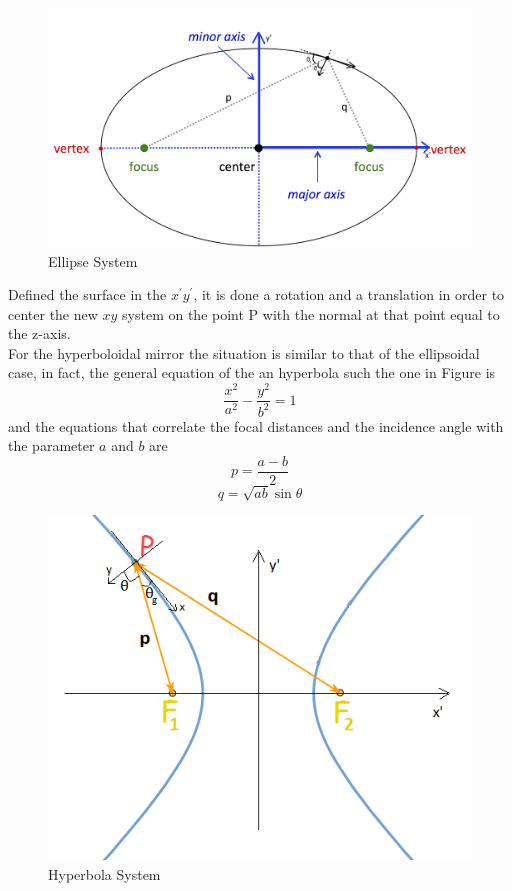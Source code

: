 %
\begin{figure}[H]
%
\centering
%
\includegraphics[width=.8\textwidth]{Immagini/Chapter3/EllipseSystem3}
%
\caption{Ellipse System}
%
\label{fig: ellipse}
%
\end{figure}
%
Defined the surface in the $x^{'}y^{'} $, it is done a rotation and a translation in order to center the new $xy $ system on the point P with the normal at that point equal to the z-axis.
\\
For the hyperboloidal mirror the situation is similar to that of the ellipsoidal case, in fact, the general equation of the an hyperbola such the one in Figure is 
%
\begin{equation}
\frac{x^2}{a^2} - \frac{y^2}{b^2} = 1
\end{equation}
%
and the equations that correlate the focal distances and the incidence angle with the parameter $a $ and $b $ are
%
\begin{equation}
p = \frac{a - b}{2}
\label{eq: 1stHypEq}
\end{equation}
%
\begin{equation}
q = \sqrt{ab} \sin\theta
\label{eq: 2ndHypEq}
\end{equation}
%
\begin{figure}[H]
%
\centering
%
\includegraphics[width=.5\textwidth]{Immagini/Chapter3/Hyperbola}
%
\caption{Hyperbola System}
%
\label{fig: hyperbola}
%
\end{figure}
